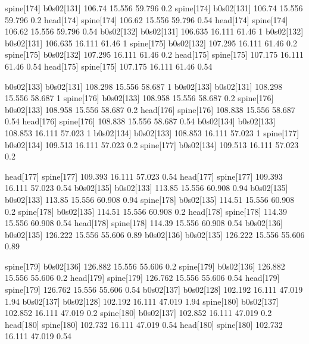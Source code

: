 spine[174]    b0s02[131]    106.74    15.556    59.796    0.2
spine[174]    b0s02[131]    106.74    15.556    59.796    0.2
head[174]    spine[174]    106.62    15.556    59.796    0.54
head[174]    spine[174]    106.62    15.556    59.796    0.54
b0s02[132]    b0s02[131]    106.635    16.111    61.46    1
b0s02[132]    b0s02[131]    106.635    16.111    61.46    1
spine[175]    b0s02[132]    107.295    16.111    61.46    0.2
spine[175]    b0s02[132]    107.295    16.111    61.46    0.2
head[175]    spine[175]    107.175    16.111    61.46    0.54
head[175]    spine[175]    107.175    16.111    61.46    0.54


b0s02[133]    b0s02[131]    108.298    15.556    58.687    1
b0s02[133]    b0s02[131]    108.298    15.556    58.687    1
spine[176]    b0s02[133]    108.958    15.556    58.687    0.2
spine[176]    b0s02[133]    108.958    15.556    58.687    0.2
head[176]    spine[176]    108.838    15.556    58.687    0.54
head[176]    spine[176]    108.838    15.556    58.687    0.54
b0s02[134]    b0s02[133]    108.853    16.111    57.023    1
b0s02[134]    b0s02[133]    108.853    16.111    57.023    1
spine[177]    b0s02[134]    109.513    16.111    57.023    0.2
spine[177]    b0s02[134]    109.513    16.111    57.023    0.2


head[177]    spine[177]    109.393    16.111    57.023    0.54
head[177]    spine[177]    109.393    16.111    57.023    0.54
b0s02[135]    b0s02[133]    113.85    15.556    60.908    0.94
b0s02[135]    b0s02[133]    113.85    15.556    60.908    0.94
spine[178]    b0s02[135]    114.51    15.556    60.908    0.2
spine[178]    b0s02[135]    114.51    15.556    60.908    0.2
head[178]    spine[178]    114.39    15.556    60.908    0.54
head[178]    spine[178]    114.39    15.556    60.908    0.54
b0s02[136]    b0s02[135]    126.222    15.556    55.606    0.89
b0s02[136]    b0s02[135]    126.222    15.556    55.606    0.89


spine[179]    b0s02[136]    126.882    15.556    55.606    0.2
spine[179]    b0s02[136]    126.882    15.556    55.606    0.2
head[179]    spine[179]    126.762    15.556    55.606    0.54
head[179]    spine[179]    126.762    15.556    55.606    0.54
b0s02[137]    b0s02[128]    102.192    16.111    47.019    1.94
b0s02[137]    b0s02[128]    102.192    16.111    47.019    1.94
spine[180]    b0s02[137]    102.852    16.111    47.019    0.2
spine[180]    b0s02[137]    102.852    16.111    47.019    0.2
head[180]    spine[180]    102.732    16.111    47.019    0.54
head[180]    spine[180]    102.732    16.111    47.019    0.54


